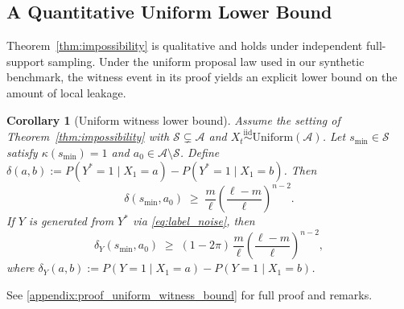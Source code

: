 \documentclass{article} %
\theoremstyle{plain}
\newtheorem{corollary}[theorem]{Corollary}
\theoremstyle{definition}
\theoremstyle{remark}
\begin{document}
\subsection{A Quantitative Uniform Lower Bound}
\label{sec:uniform_witness_bound}

Theorem~\ref{thm:impossibility} is qualitative and holds under independent full-support sampling. Under the uniform proposal law used in our synthetic benchmark, the witness event in its proof yields an explicit lower bound on the amount of local leakage.

\begin{corollary}[Uniform witness lower bound]
\label{cor:uniform_witness_bound}
Assume the setting of Theorem~\ref{thm:impossibility} with
$\mathcal{S}\subsetneq\mathcal{A}$ and
$X_t \overset{\mathrm{iid}}{\sim} \mathrm{Uniform}(\mathcal{A})$.
Let $s_{\min}\in\mathcal{S}$ satisfy $\kappa(s_{\min})=1$ and
$a_0\in\mathcal{A}\setminus\mathcal{S}$. Define
$\delta(a,b) := P(Y^*\!=\!1\mid X_1\!=\!a)
              - P(Y^*\!=\!1\mid X_1\!=\!b)$.
Then
\begin{equation}
\label{eq:witness_clean}
\delta(s_{\min},a_0)
\;\ge\;
\frac{m}{\ell}
\!\left(\frac{\ell-m}{\ell}\right)^{\!n-2}.
\end{equation}
If $Y$ is generated from $Y^*$ via \eqref{eq:label_noise}, then
\begin{equation}
\label{eq:witness_noisy}
\delta_Y(s_{\min},a_0)
\;\ge\;
(1-2\pi)\,\frac{m}{\ell}
\!\left(\frac{\ell-m}{\ell}\right)^{\!n-2},
\end{equation}
where
$\delta_Y(a,b) := P(Y\!=\!1\mid X_1\!=\!a)
                 - P(Y\!=\!1\mid X_1\!=\!b)$.
\end{corollary}

See \ref{appendix:proof_uniform_witness_bound} for full proof and remarks.
\end{document}
